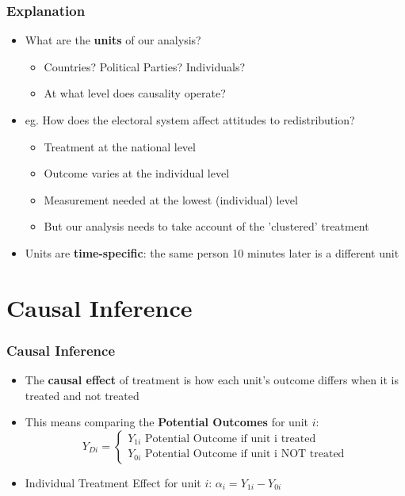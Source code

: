 \documentclass[xcolor=x11names,compress]{beamer}\usepackage[]{graphicx}\usepackage[]{color}
\renewcommand{\(}{\begin{columns}}
\renewcommand{\)}{\end{columns}}
\newcommand{\<}[1]{\begin{column}{#1}}
\renewcommand{\>}{\end{column}}
\begin{document}
\begin{frame}
\frametitle{Explanation}
\begin{itemize}
\item What are the \textbf{units} of our analysis?
\pause
\begin{itemize}
\item Countries? Political Parties? Individuals?
\pause
\item At what level does causality operate?
\end{itemize}
\pause
\item eg. How does the electoral system affect attitudes to redistribution?
\pause
\begin{itemize}
\item Treatment at the national level
\pause
\item Outcome varies at the individual level
\pause
\item Measurement needed at the lowest (individual) level
\pause
\item But our analysis needs to take account of the 'clustered' treatment
\pause
\end{itemize}
\item Units are \textbf{time-specific}: the same person 10 minutes later is a different unit
\end{itemize}
\end{frame}


\section{Causal Inference}

\begin{frame}
\frametitle{Causal Inference}
\begin{itemize}
\item The \textbf{causal effect} of treatment is how each unit's outcome differs when it is treated and not treated
\pause
\item This means comparing the \textbf{Potential Outcomes} for unit $i$:
\[
Y_{Di} = 
\begin{cases}
Y_{1i}\text{   Potential Outcome if unit i treated} \\
Y_{0i}\text{   Potential Outcome if unit i NOT treated}
\end{cases}
\]
\pause
\item Individual Treatment Effect for unit $i$: $\alpha_i = Y_{1i} - Y_{0i}$
\end{itemize}
\end{frame}
\end{document}

